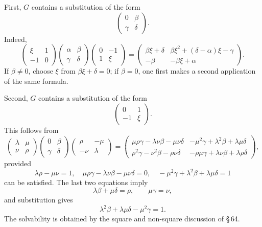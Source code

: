 \documentclass[11pt]{article}
\begin{document}
First, $G$ contains a substitution of the form
\begin{equation}
 \begin{pmatrix}0&\beta\\ \gamma&\delta\end{pmatrix}. \tag{3}
\end{equation}
Indeed,
\begin{equation}
 \begin{pmatrix}\xi&1\\-1&0\end{pmatrix}
 \begin{pmatrix}\alpha&\beta\\\gamma&\delta\end{pmatrix}
 \begin{pmatrix}0&-1\\1&\xi\end{pmatrix}
 =
 \begin{pmatrix}
 \beta\xi+\delta&\beta\xi^2+(\delta-\alpha)\xi-\gamma\\
 -\beta&-\beta\xi+\alpha
 \end{pmatrix}. \tag{4}
\end{equation}
If $\beta\ne0$, choose $\xi$ from $\beta\xi+\delta=0$; if $\beta=0$, one first makes a second application of the same formula.

Second, $G$ contains a substitution of the form
\[
 \begin{pmatrix}0&1\\-1&\xi\end{pmatrix}.
\]
This follows from
\begin{equation}
 \begin{pmatrix}\lambda&\mu\\ \nu&\rho\end{pmatrix}
 \begin{pmatrix}0&\beta\\ \gamma&\delta\end{pmatrix}
 \begin{pmatrix}\rho&-\mu\\-\nu&\lambda\end{pmatrix}
 =
 \begin{pmatrix}
 \mu\rho\gamma-\lambda\nu\beta-\mu\nu\delta&
 -\mu^2\gamma+\lambda^2\beta+\lambda\mu\delta\\
 \rho^2\gamma-\nu^2\beta-\rho\nu\delta&
 -\rho\mu\gamma+\lambda\nu\beta+\lambda\rho\delta
 \end{pmatrix}, \tag{5}
\end{equation}
provided
\begin{equation}
 \lambda\rho-\mu\nu=1,\quad
 \mu\rho\gamma-\lambda\nu\beta-\mu\nu\delta=0,\quad
 -\mu^2\gamma+\lambda^2\beta+\lambda\mu\delta=1 \tag{6}
\end{equation}
can be satisfied. The last two equations imply
\begin{equation}
 \lambda\beta+\mu\delta=\rho,\qquad \mu\gamma=\nu, \tag{7}
\end{equation}
and substitution gives
\begin{equation}
 \lambda^2\beta+\lambda\mu\delta-\mu^2\gamma=1. \tag{8}
\end{equation}
The solvability is obtained by the square and non-square discussion of \S\,64.
\end{document}
